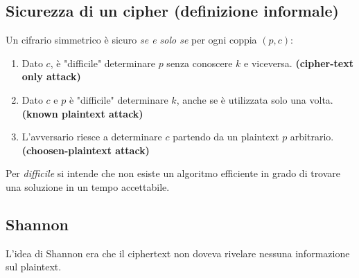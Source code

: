 \documentclass[a4paper,12pt]{article}
\begin{document}
\subsection{Sicurezza di un cipher (definizione informale)}
Un cifrario simmetrico è sicuro \textit{se e solo se} per ogni coppia $(p,c)$:
\begin{enumerate}
	\item Dato $c$, è "difficile" determinare $p$ senza conoscere $k$ e viceversa. \textbf{(cipher-text only attack)}
	\item Dato $c$ e $p$ è "difficile" determinare $k$, anche se è utilizzata solo una volta. \textbf{(known plaintext attack)}
	\item L'avversario riesce a determinare $c$ partendo da un plaintext $p$ arbitrario. \textbf{(choosen-plaintext attack)}
\end{enumerate}
Per \textit{difficile} si intende che non esiste un algoritmo efficiente in grado di trovare una soluzione in un tempo accettabile.

\subsection{Shannon}
L'idea di Shannon era che il ciphertext non doveva rivelare nessuna informazione sul plaintext.
\end{document}
